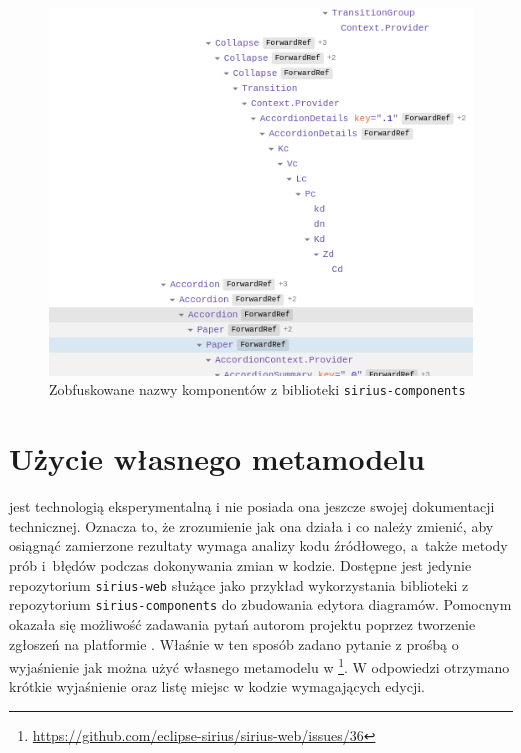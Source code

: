 \begin{figure}[!ht]
  \centering

  \includegraphics[width=0.7\linewidth]{./images/sirius-web-minified-component-names.png}
  \caption{Zobfuskowane nazwy komponentów z biblioteki
    \texttt{sirius-components}}\label{rys:sirius-web-minified-component-names}
\end{figure}

\section{Użycie własnego metamodelu}

\SiriusWeb{} jest technologią eksperymentalną i nie posiada ona jeszcze
swojej dokumentacji technicznej. Oznacza to, że zrozumienie jak ona działa i co
należy zmienić, aby osiągnąć zamierzone rezultaty wymaga analizy kodu
źródłowego, a~także metody prób i~błędów podczas
dokonywania zmian w
kodzie. Dostępne jest jedynie repozytorium \texttt{sirius-web} służące jako
przykład wykorzystania biblioteki z repozytorium \texttt{sirius-components}
do zbudowania edytora diagramów.
Pomocnym okazała się możliwość zadawania pytań autorom projektu poprzez
tworzenie zgłoszeń na platformie \GitHub{}. Właśnie w ten sposób zadano
pytanie z prośbą o wyjaśnienie jak można użyć własnego metamodelu \EMF{} w
\SiriusWeb{}\footnote{
	\url{https://github.com/eclipse-sirius/sirius-web/issues/36}
}. W odpowiedzi otrzymano krótkie wyjaśnienie oraz listę miejsc w kodzie
wymagających edycji.

